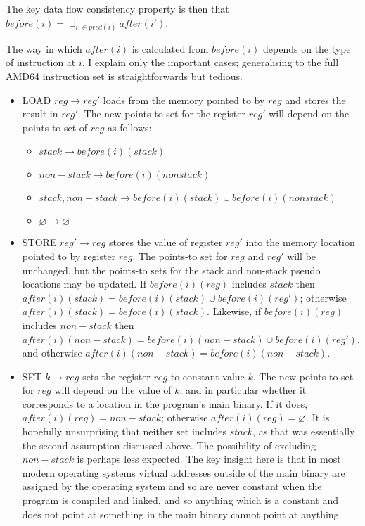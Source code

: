 The key data flow consistency property is then that $before(i) =
\sqcup_{i' \in pred(i)}after(i')$.  

The way in which $after(i)$ is calculated from $before(i)$ depends on
the type of instruction at $i$.  I explain only the important cases;
generalising to the full AMD64 instruction set is straightforwards but
tedious.

\begin{itemize}
\item
  LOAD $reg \rightarrow reg'$ loads from the memory pointed to by
  $reg$ and stores the result in $reg'$.  The new points-to set
  for the register $reg'$ will depend on the points-to set
  of $reg$ as follows:

  \begin{itemize}
  \item $stack \rightarrow before(i)(stack)$
  \item $non-stack \rightarrow before(i)(nonstack)$
  \item ${stack,non-stack} \rightarrow before(i)(stack) {\cup} before(i)(nonstack)$
  \item $\varnothing \rightarrow \varnothing$ 
  \end{itemize}

\item
  STORE $reg' \rightarrow reg$ stores the value of register $reg'$
  into the memory location pointed to by register $reg$.  The
  points-to set for $reg$ and $reg'$ will be unchanged, but the
  points-to sets for the stack and non-stack pseudo locations may be
  updated.  If $before(i)(reg)$ includes $stack$ then $after(i)(stack)
  = before(i)(stack) \cup before(i)(reg')$; otherwise $after(i)(stack)
  = before(i)(stack)$.  Likewise, if $before(i)(reg)$ includes
  $non-stack$ then $after(i)(non-stack) = before(i)(non-stack) \cup
  before(i)(reg')$, and otherwise $after(i)(non-stack) =
  before(i)(non-stack)$.
\item
  SET $k \rightarrow reg$ sets the register $reg$ to constant value
  $k$.  The new points-to set for $reg$ will depend on the value of
  $k$, and in particular whether it corresponds to a location in the
  program's main binary.  If it does, $after(i)(reg) = non-stack$;
  otherwise $after(i)(reg) = \varnothing$.  It is hopefully
  unsurprising that neither set includes $stack$, as that was
  essentially the second assumption discussed
  above.  The possibility of excluding
  $non-stack$ is perhaps less expected.  The key insight here is that
  in most modern operating systems virtual addresses outside of the
  main binary are assigned by the operating system and so are never
  constant when the program is compiled and linked, and so anything
  which is a constant and does not point at something in the main
  binary cannot point at anything.


\end{itemize}
